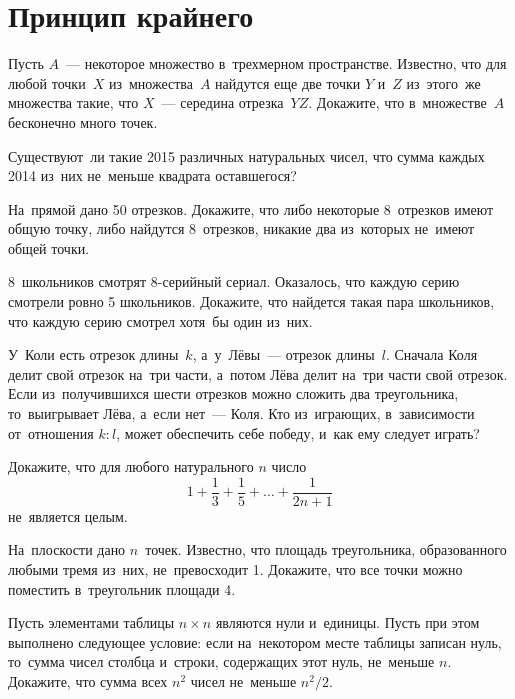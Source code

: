 
\section*{Принцип крайнего}


\begin{problems}

\item
Пусть $A$~--- некоторое множество в~трехмерном пространстве.
Известно, что для любой точки~$X$ из~множества~$A$ найдутся еще две точки
$Y$ и~$Z$ из~этого~же множества такие, что $X$~--- середина отрезка~$YZ$.
Докажите, что в~множестве~$A$ бесконечно много точек.

\item
Существуют~ли такие 2015 различных натуральных чисел, что сумма каждых 2014
из~них не~меньше квадрата оставшегося?

\item
На~прямой дано 50 отрезков.
Докажите, что либо некоторые 8~отрезков имеют общую точку, либо найдутся
8~отрезков, никакие два из~которых не~имеют общей точки.

\item
8~школьников смотрят 8-серийный сериал.
Оказалось, что каждую серию смотрели ровно 5 школьников.
Докажите, что найдется такая пара школьников, что каждую серию смотрел хотя~бы
один из~них.

\item
У~Коли есть отрезок длины~$k$, а~у~Лёвы~--- отрезок длины~$l$.
Сначала Коля делит свой отрезок на~три части, а~потом Лёва делит на~три части
свой отрезок.
Если из~получившихся шести отрезков можно сложить два треугольника,
то~выигрывает Лёва, а~если нет~--- Коля.
Кто из~играющих, в~зависимости от~отношения $k : l$, может обеспечить себе
победу, и~как ему следует играть?

\item
Докажите, что для любого натурального $n$ число
\[
    1 + \frac{1}{3} + \frac{1}{5} + \ldots + \frac{1}{2 n + 1}
\]
не~является целым.

\item
На~плоскости дано $n$~точек.
Известно, что площадь треугольника, образованного любыми тремя из~них,
не~превосходит 1.
Докажите, что все точки можно поместить в~треугольник площади 4.

\item
Пусть элементами таблицы $n \times n$ являются нули и~единицы.
Пусть при этом выполнено следующее условие: если на~некотором месте таблицы
записан нуль, то~сумма чисел столбца и~строки, содержащих этот нуль,
не~меньше $n$.
Докажите, что сумма всех $n^2$ чисел не~меньше $n^2 / 2$.

\end{problems}

